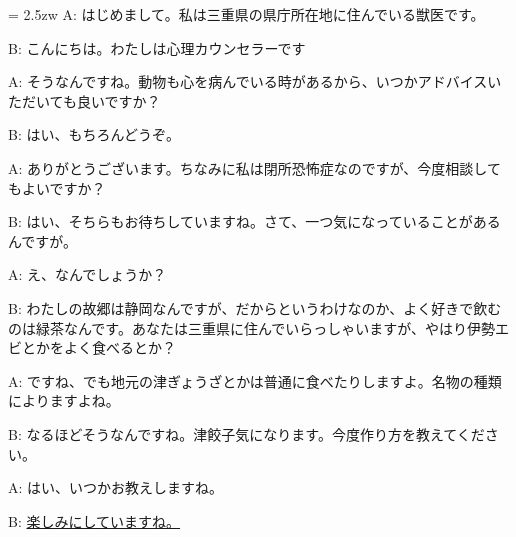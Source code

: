 \documentclass[11pt]{amsart}
\title{}
\author{}
\newenvironment{hangall}[1]{\hangindent = 2.5zw\everypar{\hangindent = 2.5zw}}{}
\begin{document}
\maketitle
\begin{hangall}{}%
A: はじめまして。私は三重県の県庁所在地に住んでいる獣医です。

B: こんにちは。わたしは心理カウンセラーです

A: そうなんですね。動物も心を病んでいる時があるから、いつかアドバイスいただいても良いですか？

B: はい、もちろんどうぞ。

A: ありがとうございます。ちなみに私は閉所恐怖症なのですが、今度相談してもよいですか？

B: はい、そちらもお待ちしていますね。さて、一つ気になっていることがあるんですが。

A: え、なんでしょうか？

B: わたしの故郷は静岡なんですが、だからというわけなのか、よく好きで飲むのは緑茶なんです。あなたは三重県に住んでいらっしゃいますが、やはり伊勢エビとかをよく食べるとか？

A: ですね、でも地元の津ぎょうざとかは普通に食べたりしますよ。名物の種類によりますよね。

B: なるほどそうなんですね。津餃子気になります。今度作り方を教えてください。

A: はい、いつかお教えしますね。

B: \ul{楽しみにしていますね。}\end{hangall}
\end{document}
